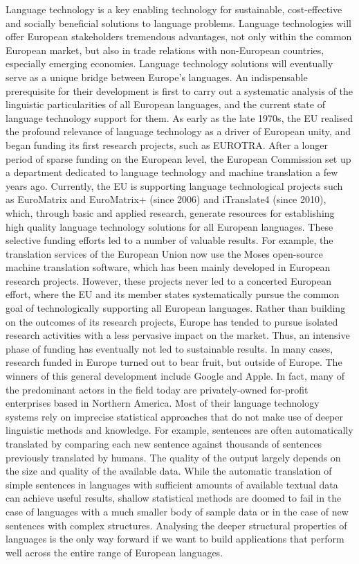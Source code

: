 \begin{multicols}{2}
Language technology is a key enabling technology for sustainable, cost-effective and socially beneficial solutions to language problems. Language technologies will offer European stakeholders tremendous advantages, not only within the common European market, but also in trade relations with non-European countries, especially emerging economies. Language technology solutions will eventually serve as a unique bridge between Europe's languages. An indispensable prerequisite for their development is first to carry out a systematic analysis of the linguistic particularities of all European languages, and the current state of language technology support for them.  As early as the late 1970s, the EU realised the profound relevance of language technology as a driver of European unity, and began funding its first research projects, such as EUROTRA. After a longer period of sparse funding on the European level, the European Commission set up a department dedicated to language technology and machine translation a few years ago. Currently, the EU is supporting language technological projects such as EuroMatrix and EuroMatrix+ (since 2006) and iTranslate4 (since 2010), which, through basic and applied research, generate resources for establishing high quality language technology solutions for all European languages.  These selective funding efforts led to a number of valuable results. For example, the translation services of the European Union now use the Moses open-source machine translation software, which has been mainly developed in European research projects. However, these projects never led to a concerted European effort, where the EU and its member states systematically pursue the common goal of technologically supporting all European languages.    Rather than building on the outcomes of its research projects, Europe has tended to pursue isolated research activities with a less pervasive impact on the market. Thus, an intensive phase of funding has eventually not led to sustainable results. In many cases, research funded in Europe turned out to bear fruit, but outside of Europe. The winners of this general development include Google and Apple.  In fact, many of the predominant actors in the field today are privately-owned for-profit enterprises based in Northern America. Most of their language technology systems rely on imprecise statistical approaches that do not make use of deeper linguistic methods and knowledge. For example, sentences are often automatically translated by comparing each new sentence against thousands of sentences previously translated by humans.  The quality of the output largely depends on the size and quality of the available data. While the automatic translation of simple sentences in languages with sufficient amounts of available textual data can achieve useful results, shallow statistical methods are doomed to fail in the case of languages with a much smaller body of sample data or in the case of new sentences with complex structures. Analysing the deeper structural properties of languages is the only way forward if we want to build applications that perform well across the entire range of European languages.  


\end{multicols}
